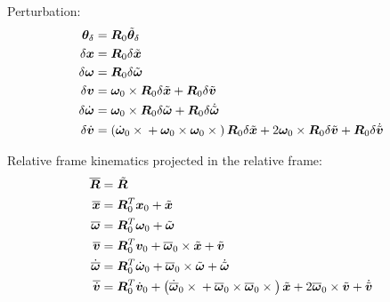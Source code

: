 \documentclass[10pt,dvips,fleqn,subeqn]{report}
\newcommand{\T}[1]{\bm{#1}}
\newcommand{\TT}[1]{\bm{#1}}
\begin{document}
Perturbation:
\begin{subequations}
\begin{align}
	\T{\theta}_{\delta} &= \TT{R}_0 \tilde{\T{\theta}}_{\delta} \\
	\delta\T{x} &= \TT{R}_0 \delta\tilde{\T{x}} \\
	\delta\T{\omega} &= \TT{R}_0 \delta\tilde{\T{\omega}} \\
	\delta\T{v} &= \T{\omega}_0 \times \TT{R}_0 \delta\tilde{\T{x}}
		+ \TT{R}_0 \delta\tilde{\T{v}} \\
	\delta\dot{\T{\omega}} &= \T{\omega}_0 \times \TT{R}_0 \delta\tilde{\T{\omega}} 
		+ \TT{R}_0 \delta\dot{\tilde{\T{\omega}}} \\
	\delta\dot{\T{v}} &= \plbr{
			\dot{\T{\omega}}_0 \times{}
			+ \T{\omega}_0 \times \T{\omega}_0 \times{}
		} \TT{R}_0 \delta\tilde{\T{x}}
		+ 2 \T{\omega}_0 \times \TT{R}_0 \delta\tilde{\T{v}}
		+ \TT{R}_0 \delta\dot{\tilde{\T{v}}}
\end{align}
\end{subequations}

Relative frame kinematics projected in the relative frame:
\begin{subequations}
\begin{align}
	\overline{\TT{R}} &= \tilde{\TT{R}} \\
	\overline{\T{x}} &= \TT{R}_0^T \T{x}_0
		+ \tilde{\T{x}} \\
	\overline{\T{\omega}} &= \TT{R}_0^T \T{\omega}_0
		+ \tilde{\T{\omega}} \\
	\overline{\T{v}} &= \TT{R}_0^T \T{v}_0
		+ \overline{\T{\omega}}_0 \times \tilde{\T{x}}
		+ \tilde{\T{v}} \\
	\dot{\overline{\T{\omega}}} &= \TT{R}_0^T \dot{\T{\omega}}_0
		+ \overline{\T{\omega}}_0 \times \tilde{\T{\omega}} 
		+ \dot{\tilde{\T{\omega}}} \\
	\overline{\dot{\T{v}}} &= \TT{R}_0^T \dot{\T{v}}_0
		+ \plbr{
			\dot{\overline{\T{\omega}}}_0 \times{}
			+ \overline{\T{\omega}}_0 \times \overline{\T{\omega}}_0 \times{}
		} \tilde{\T{x}}
		+ 2 \overline{\T{\omega}}_0 \times \tilde{\T{v}}
		+ \dot{\tilde{\T{v}}}
\end{align}
\end{subequations}
\end{document}
